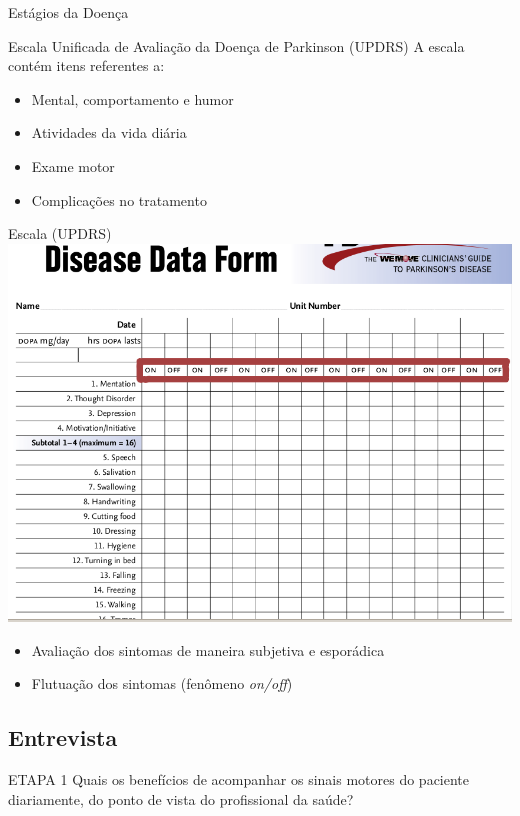 \documentclass{beamer}
\begin{document}
\begin{frame}{Estágios da Doença}
  \begin{block}{Escala Unificada de Avaliação da Doença de Parkinson (UPDRS)}
      A escala contém itens referentes a:
	\begin{itemize}
	 \item Mental, comportamento e humor
	 \item Atividades da vida diária
	 \item Exame motor
	 \item Complicações no tratamento
	\end{itemize}
 \end{block}
\end{frame}

\begin{frame}{Escala (UPDRS)} 
      \center \includegraphics[height=2.0 in]{img/updr1-sel.png}
     \begin{itemize}
	\item Avaliação dos sintomas de maneira subjetiva e esporádica
	\item Flutuação dos sintomas (fenômeno \textit{on/off})
     \end{itemize}

\end{frame}



\subsection{Entrevista}
\begin{frame}
  \begin{block}{ETAPA 1}
   Quais os benefícios de acompanhar os sinais motores do paciente diariamente, do ponto de vista do profissional da saúde?
  \end{block}
\end{frame}
\end{document}
